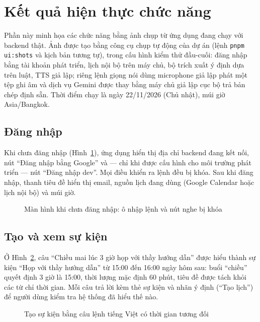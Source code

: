 \section{Kết quả hiện thực chức năng}
Phần này minh họa các chức năng bằng ảnh chụp từ ứng dụng đang chạy với backend thật. Ảnh được tạo bằng công cụ chụp tự động của dự án (lệnh \texttt{pnpm ui:shots} và kịch bản tương tự), trong cấu hình kiểm thử đầu-cuối: đăng nhập bằng tài khoản phát triển, lịch nội bộ trên máy chủ, bộ trích xuất ý định dựa trên luật, TTS giả lập; riêng lệnh giọng nói dùng microphone giả lập phát một tệp ghi âm và dịch vụ Gemini được thay bằng máy chủ giả lập cục bộ trả bản chép định sẵn. Thời điểm chạy là ngày 22/11/2026 (Chủ nhật), múi giờ Asia/Bangkok.

\subsection{Đăng nhập}
Khi chưa đăng nhập (Hình~\ref{fig:signed-out}), ứng dụng hiển thị địa chỉ backend đang kết nối, nút “Đăng nhập bằng Google” và — chỉ khi được cấu hình cho môi trường phát triển — nút “Đăng nhập dev”. Mọi điều khiển ra lệnh đều bị khóa. Sau khi đăng nhập, thanh tiêu đề hiển thị email, nguồn lịch đang dùng (Google Calendar hoặc lịch nội bộ) và múi giờ.

\begin{figure}[!htbp]
\centering
{}
\caption{Màn hình khi chưa đăng nhập: ô nhập lệnh và nút nghe bị khóa}\label{fig:signed-out}
\end{figure}

\subsection{Tạo và xem sự kiện}
Ở Hình~\ref{fig:create}, câu “Chiều mai lúc 3 giờ họp với thầy hướng dẫn” được hiểu thành sự kiện “Họp với thầy hướng dẫn” từ 15:00 đến 16:00 ngày hôm sau: buổi “chiều” quyết định 3 giờ là 15:00, thời lượng mặc định 60 phút, tiêu đề được tách khỏi các từ chỉ thời gian. Mỗi câu trả lời kèm thẻ sự kiện và nhãn ý định (“Tạo lịch”) để người dùng kiểm tra hệ thống đã hiểu thế nào.

\begin{figure}[!htbp]
\centering
{}
\caption{Tạo sự kiện bằng câu lệnh tiếng Việt có thời gian tương đối}\label{fig:create}
\end{figure}

